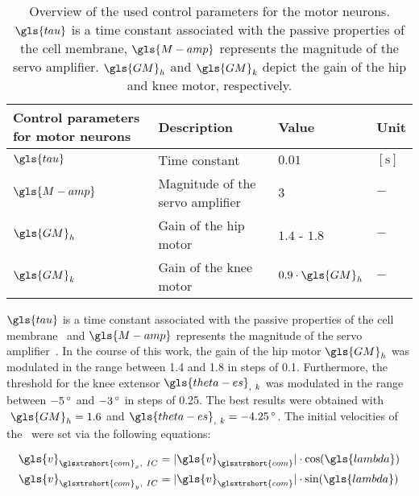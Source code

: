     \begin{table}[H]
        \caption{Overview of the used control parameters for the motor neurons. $\gls{tau}$ is a time constant associated with the passive properties of the cell membrane, $\gls{M-amp}$ represents the magnitude of the servo amplifier. $\gls{GM}_h$ and $\gls{GM}_k$ depict the gain of the hip and knee motor, respectively.} 
        \label{tab:control-parameters-motor}
        \begin{center}
            \begin{tabular}{ l|l|l|l }
                \textbf{Control parameters for motor neurons} & \textbf{Description} & \textbf{Value} & \textbf{Unit} \\ [0.5ex]
                \hline \hline
                $\gls{tau}$     & Time constant                     & $0.01$                    & $\left[\si{\second}\right]$   \\
                $\gls{M-amp}$   & Magnitude of the servo amplifier  &   $3$                     & $-$                           \\
                $\gls{GM}_h$    & Gain of the hip motor             & $1.4$ - $1.8$             & $-$                           \\
                $\gls{GM}_k$    & Gain of the knee motor            & $0.9 \cdot \gls{GM}_h$    & $-$                           \\
            \end{tabular}
        \end{center}
    \end{table}

    $\gls{tau}$ is a time constant associated with the passive properties of the cell membrane~\cite{Gallagher1996} and $\gls{M-amp}$ represents the magnitude of the servo amplifier~\cite{Geng2006}. In the course of this work, the gain of the hip motor$~\gls{GM}_h$ was modulated in the range between 1.4 and 1.8 in steps of 0.1. Furthermore, the threshold for the knee extensor$~\gls{theta-es}_{,~k}$ was modulated in the range between $-5\,\textrm{\si{\degree}}$ and $-3\,\textrm{\si{\degree}}$ in steps of 0.25. The best results were obtained with$~\gls{GM}_h = 1.6$ and$~\gls{theta-es}_{,~k} = -4.25\,\textrm{\si{\degree}}$. The initial velocities of the~ were set via the following equations:

    \begin{align}
        \gls{v}_{\glsxtrshort{com}_x,~IC} &= \vert \gls{v}_{\glsxtrshort{com}} \vert \cdot \textrm{cos}(\gls{lambda}) \notag \\
        \gls{v}_{\glsxtrshort{com}_y,~IC} &= \vert \gls{v}_{\glsxtrshort{com}} \vert \cdot \textrm{sin}(\gls{lambda})
        \label{eq:com-velocities}%
    \end{align}

